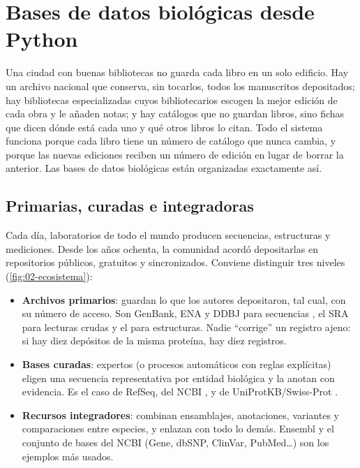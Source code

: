 \section{Bases de datos biológicas desde Python}\label{sec:02-bases}

\begin{intuicion}
Una ciudad con buenas bibliotecas no guarda cada libro en un solo edificio. Hay un archivo nacional que conserva, sin tocarlos, todos los manuscritos depositados; hay bibliotecas especializadas cuyos bibliotecarios escogen la mejor edición de cada obra y le añaden notas; y hay catálogos que no guardan libros, sino fichas que dicen dónde está cada uno y qué otros libros lo citan. Todo el sistema funciona porque cada libro tiene un número de catálogo que nunca cambia, y porque las nuevas ediciones reciben un número de edición en lugar de borrar la anterior. Las bases de datos biológicas están organizadas exactamente así.
\end{intuicion}

\subsection{Primarias, curadas e integradoras}

Cada día, laboratorios de todo el mundo producen secuencias, estructuras y mediciones. Desde los años ochenta, la comunidad acordó depositarlas en repositorios públicos, gratuitos y sincronizados. Conviene distinguir tres niveles (\cref{fig:02-ecosistema}):

\begin{itemize}
  \item \textbf{Archivos primarios}: guardan lo que los autores depositaron, tal cual, con su número de acceso. Son GenBank, ENA y DDBJ para secuencias \parencite{c02-arita2021}, el SRA para lecturas crudas \parencite{c02-leinonen2011} y el  para estructuras. Nadie ``corrige'' un registro ajeno: si hay diez depósitos de la misma proteína, hay diez registros.
  \item \textbf{Bases curadas}: expertos (o procesos automáticos con reglas explícitas) eligen una secuencia representativa por entidad biológica y la anotan con evidencia. Es el caso de RefSeq, del NCBI \parencite{c02-oleary2016}, y de UniProtKB/Swiss-Prot \parencite{c02-uniprot2025}.
  \item \textbf{Recursos integradores}: combinan ensamblajes, anotaciones, variantes y comparaciones entre especies, y enlazan con todo lo demás. Ensembl \parencite{c02-dyer2025} y el conjunto de bases del NCBI (Gene, dbSNP, ClinVar, PubMed\ldots) \parencite{c02-sayers2025ncbi} son los ejemplos más usados.
\end{itemize}

